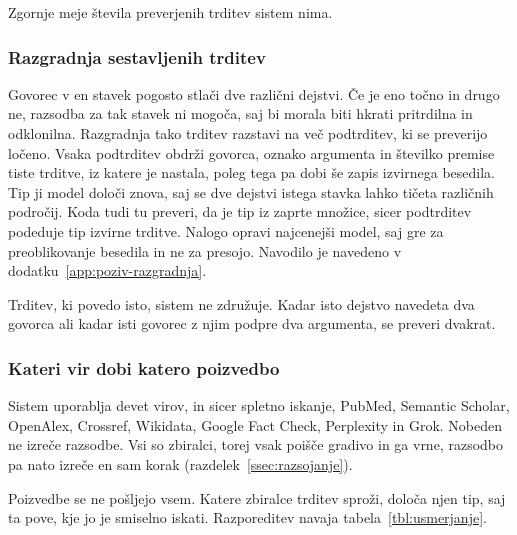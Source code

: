 \documentclass[a4paper, 12pt]{book}
\begin{document}
Zgornje meje števila preverjenih trditev sistem nima.

\subsubsection{Razgradnja sestavljenih trditev}
\label{ssec:clustering}

Govorec v en stavek pogosto stlači dve različni dejstvi. Če je eno točno in
drugo ne, razsodba za tak stavek ni mogoča, saj bi morala biti hkrati pritrdilna
in odklonilna. Razgradnja tako trditev razstavi na več podtrditev, ki se
preverijo ločeno. Vsaka podtrditev obdrži govorca, oznako argumenta in številko
premise tiste trditve, iz katere je nastala, poleg tega pa dobi še zapis
izvirnega besedila. Tip ji model določi znova, saj se dve dejstvi istega stavka
lahko tičeta različnih področij. Koda tudi tu preveri, da je tip iz zaprte
množice, sicer podtrditev podeduje tip izvirne trditve. Nalogo opravi
najcenejši model, saj gre za preoblikovanje besedila in ne za presojo. Navodilo
je navedeno v dodatku~\ref{app:poziv-razgradnja}.

Trditev, ki povedo isto, sistem ne združuje. Kadar isto dejstvo navedeta dva
govorca ali kadar isti govorec z njim podpre dva argumenta, se preveri dvakrat.

\subsubsection{Kateri vir dobi katero poizvedbo}
\label{ssec:engine-routing}

Sistem uporablja devet virov, in sicer spletno iskanje, PubMed, Semantic
Scholar, OpenAlex, Crossref, Wikidata, Google Fact Check, Perplexity in Grok.
Nobeden ne izreče razsodbe. Vsi so zbiralci, torej vsak poišče gradivo in ga
vrne, razsodbo pa nato izreče en sam korak
(razdelek~\ref{ssec:razsojanje}).

Poizvedbe se ne pošljejo vsem. Katere zbiralce trditev sproži, določa njen tip,
saj ta pove, kje jo je smiselno iskati. Razporeditev navaja
tabela~\ref{tbl:usmerjanje}.
\end{document}
